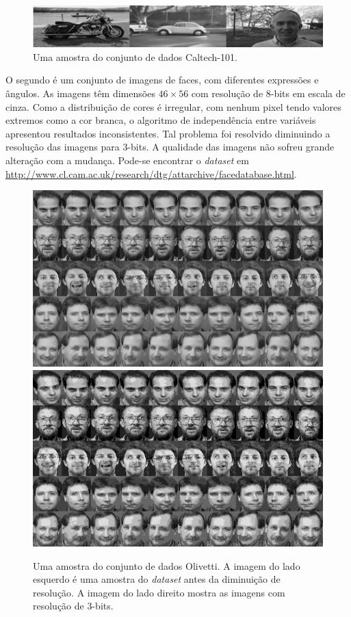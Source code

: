 \documentclass[12pt]{article}
\theoremstyle{plain}
\numberwithin{equation}{section}
\begin{document}
\begin{figure}[h]
  \centering\includegraphics[scale=1.0]{imgs/caltech_sample.png}
  \caption{Uma amostra do conjunto de dados Caltech-101.}
\end{figure}

O segundo é um conjunto de imagens de faces, com diferentes expressões e ângulos. As imagens têm
dimensões $46\times 56$ com resolução de 8-bits em escala de cinza. Como a distribuição de cores é
irregular, com nenhum pixel tendo valores extremos como a cor branca, o algoritmo de independência
entre variáveis apresentou resultados inconsistentes. Tal problema foi resolvido diminuindo a
resolução das imagens para 3-bits. A qualidade das imagens não sofreu grande alteração com a
mudança. Pode-se encontrar o \textit{dataset} em
\url{http://www.cl.cam.ac.uk/research/dtg/attarchive/facedatabase.html}.

\begin{figure}[h]
  \centering\includegraphics[scale=0.5]{imgs/olivetti_sample.png}
  \includegraphics[scale=0.5]{imgs/olivetti-8_sample.png}
  \captionsetup{justification=raggedright}
  \caption{Uma amostra do conjunto de dados Olivetti. A imagem do lado esquerdo é uma amostra do
  \textit{dataset} antes da diminuição de resolução. A imagem do lado direito mostra as imagens com
  resolução de 3-bits.}
\end{figure}
\end{document}
